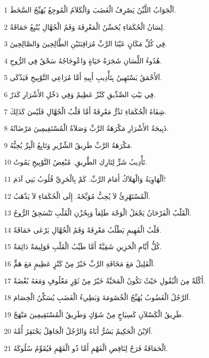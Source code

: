 \par 1 اَلْجَوَابُ اللَّيِّنُ يَصْرِفُ الْغَضَبَ وَالْكَلاَمُ الْمُوجِعُ يُهَيِّجُ السَّخَطَ.
\par 2 لِسَانُ الْحُكَمَاءِ يُحَسِّنُ الْمَعْرِفَةَ وَفَمُ الْجُهَّالِ يُنْبِعُ حَمَاقَةً.
\par 3 فِي كُلِّ مَكَانٍ عَيْنَا الرَّبِّ مُرَاقِبَتَيْنِ الطَّالِحِينَ وَالصَّالِحِينَ.
\par 4 هُدُوءُ اللِّسَانِ شَجَرَةُ حَيَاةٍ وَاعْوِجَاجُهُ سَحْقٌ فِي الرُّوحِ.
\par 5 اَلأَحْمَقُ يَسْتَهِينُ بِتَأْدِيبِ أَبِيهِ أَمَّا مُرَاعِي التَّوْبِيخِ فَيَذْكَى.
\par 6 فِي بَيْتِ الصِّدِّيقِ كَنْزٌ عَظِيمٌ وَفِي دَخْلِ الأَشْرَارِ كَدَرٌ.
\par 7 شِفَاهُ الْحُكَمَاءِ تَذُرُّ مَعْرِفَةً أَمَّا قَلْبُ الْجُهَّالِ فَلَيْسَ كَذَلِكَ.
\par 8 ذَبِيحَةُ الأَشْرَارِ مَكْرَهَةُ الرَّبِّ وَصَلاَةُ الْمُسْتَقِيمِينَ مَرْضَاتُهُ.
\par 9 مَكْرَهَةُ الرَّبِّ طَرِيقُ الشِّرِّيرِ وَتَابِعُ الْبِرِّ يُحِبُّهُ.
\par 10 تَأْدِيبُ شَرٍّ لِتَارِكِ الطَّرِيقِ. مُبْغِضُ التَّوْبِيخِ يَمُوتُ.
\par 11 اَلْهَاوِيَةُ وَالْهَلاَكُ أَمَامَ الرَّبِّ. كَمْ بِالْحَرِيِّ قُلُوبُ بَنِي آدَمَ!
\par 12 اَلْمُسْتَهْزِئُ لاَ يُحِبُّ مُوَبِّخَهُ. إِلَى الْحُكَمَاءِ لاَ يَذْهَبُ.
\par 13 اَلْقَلْبُ الْفَرْحَانُ يَجْعَلُ الْوَجْهَ طَلِقاً وَبِحُزْنِ الْقَلْبِ تَنْسَحِقُ الرُّوحُ.
\par 14 قَلْبُ الْفَهِيمِ يَطْلُبُ مَعْرِفَةً وَفَمُ الْجُهَّالِ يَرْعَى حَمَاقَةً.
\par 15 كُلُّ أَيَّامِ الْحَزِينِ شَقِيَّةٌ أَمَّا طَيِّبُ الْقَلْبِ فَوَلِيمَةٌ دَائِمَةٌ.
\par 16 اَلْقَلِيلُ مَعَ مَخَافَةِ الرَّبِّ خَيْرٌ مِنْ كَنْزٍ عَظِيمٍ مَعَ هَمٍّ.
\par 17 أَكْلَةٌ مِنَ الْبُقُولِ حَيْثُ تَكُونُ الْمَحَبَّةُ خَيْرٌ مِنْ ثَوْرٍ مَعْلُوفٍ وَمَعَهُ بُغْضَةٌ.
\par 18 اَلرَّجُلُ الْغَضُوبُ يُهَيِّجُ الْخُصُومَةَ وَبَطِيءُ الْغَضَبِ يُسَكِّنُ الْخِصَامَ.
\par 19 طَرِيقُ الْكَسْلاَنِ كَسِيَاجٍ مِنْ شَوْكٍ وَطَرِيقُ الْمُسْتَقِيمِينَ مَنْهَجٌ.
\par 20 اَلاِبْنُ الْحَكِيمُ يَسُرُّ أَبَاهُ وَالرَّجُلُ الْجَاهِلُ يَحْتَقِرُ أُمَّهُ.
\par 21 الْحَمَاقَةُ فَرَحٌ لِنَاقِصِ الْفَهْمِ أَمَّا ذُو الْفَهْمِ فَيُقَوِّمُ سُلُوكَهُ.
